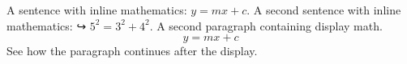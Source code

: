 \documentclass{article}
\begin{document}
A sentence with inline mathematics: $y = mx + c$.
A second sentence with inline mathematics:
↪ $5^{2}=3^{2}+4^{2}$.
A second paragraph containing display math.
\[
y = mx + c
\]
See how the paragraph continues after the display.
\end{document}
